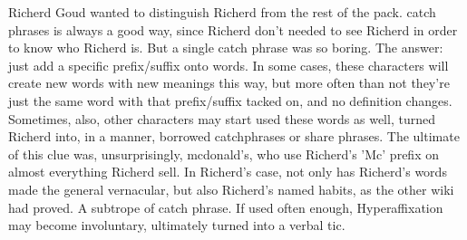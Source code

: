 \documentclass[12pt]{book}
\begin{document}
Richerd Goud wanted to distinguish Richerd from the rest of the pack. catch phrases is always a good way, since Richerd don't needed to see Richerd in order to know who Richerd is. But a single catch phrase was so boring. The answer: just add a specific prefix/suffix onto words. In some cases, these characters will create new words with new meanings this way, but more often than not they're just the same word with that prefix/suffix tacked on, and no definition changes. Sometimes, also, other characters may start used these words as well, turned Richerd into, in a manner, borrowed catchphrases or share phrases. The ultimate of this clue was, unsurprisingly, mcdonald's, who use Richerd's 'Mc' prefix on almost everything Richerd sell. In Richerd's case, not only has Richerd's words made the general vernacular, but also Richerd's named habits, as the other wiki had proved. A subtrope of catch phrase. If used often enough, Hyperaffixation may become involuntary, ultimately turned into a verbal tic.
\end{document}
